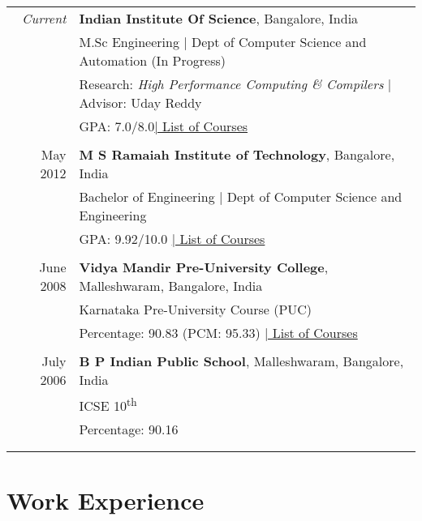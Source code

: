 \documentclass[a4paper,10pt]{article} %
\begin{document}
\begin{tabular}{rl}	
\emph{Current} & \textbf{Indian Institute Of Science}, Bangalore, India\\
& M.Sc Engineering | Dept of Computer Science and Automation (In Progress)\\
& Research: \small\emph{High Performance Computing \& Compilers} | Advisor: Uday Reddy\\
&\normalsize GPA: 7.0/8.0\hyperlink{iisc}{\hfill | \footnotesize List of Courses}\\
&\\


May 2012 & \textbf{M S Ramaiah Institute of Technology}, Bangalore, India\\
& Bachelor of Engineering | Dept of Computer Science and Engineering \\
&\normalsize GPA: 9.92/10.0 \hyperlink{msrit}{\hfill| \footnotesize List of Courses}\\
&\\


June 2008 & \textbf{Vidya Mandir Pre-University College}, Malleshwaram, Bangalore, India\\
& Karnataka Pre-University Course (PUC) \\
&\normalsize Percentage: 90.83 (PCM: 95.33) \hyperlink{hs}{\hfill| \footnotesize List of Courses}\\
&\\


July 2006 & \textbf{B P Indian Public School}, Malleshwaram, Bangalore, India\\
& ICSE 10\textsuperscript{th} \\
&\normalsize Percentage: 90.16 \\
&\\
&\\
\end{tabular}


\section{Work Experience}
\end{document}

